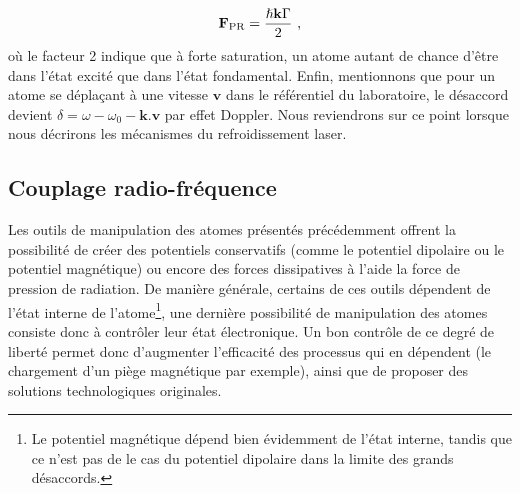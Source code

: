 \begin{equation}
\mathbf{F}_{\mathrm{PR}}=\frac{\hslash \mathbf{k} \Gamma}{2} \text{ ,}
\end{equation}
où le facteur 2 indique que à forte saturation, un atome autant de chance d'être dans l'état excité que dans l'état fondamental. Enfin, mentionnons que pour un atome se déplaçant à une vitesse $\mathbf{v}$ dans le référentiel du laboratoire, le désaccord devient $\delta=\omega-\omega_0-\mathbf{k}.\mathbf{v}$ par effet Doppler. Nous reviendrons sur ce point lorsque nous décrirons les mécanismes du refroidissement laser.





\subsection{Couplage radio-fréquence} 
Les outils de manipulation des atomes présentés précédemment offrent la possibilité de créer des potentiels conservatifs (comme le potentiel dipolaire ou le potentiel magnétique) ou encore des forces dissipatives à l'aide la force de pression de radiation. De manière générale, certains de ces outils dépendent de l'état interne de l'atome\footnote{Le potentiel magnétique dépend bien évidemment de l'état interne, tandis que ce n'est pas de le cas du potentiel dipolaire dans la limite des grands désaccords.}, une dernière possibilité de manipulation des atomes consiste donc à contrôler leur état électronique. Un bon contrôle de ce degré de liberté permet donc d'augmenter l'efficacité des processus qui en dépendent (le chargement d'un piège magnétique par exemple), ainsi que de proposer des solutions technologiques originales. 

